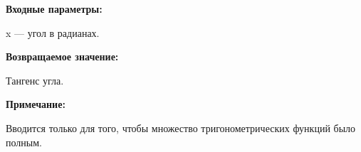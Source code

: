 \textbf{Входные параметры:}

 x --- угол в радианах.

\textbf{Возвращаемое значение:}

Тангенс угла.

\textbf{Примечание:}

 Вводится только для того, чтобы множество тригонометрических функций было полным.